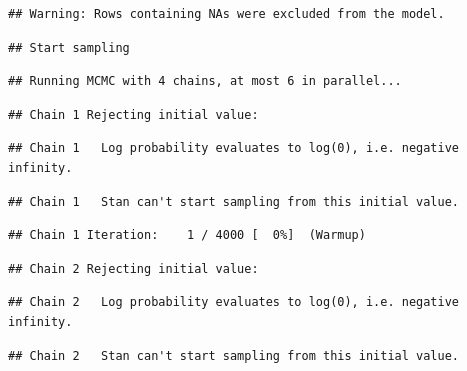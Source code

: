 \documentclass[
]{article}
\begin{document}
\begin{verbatim}
## Warning: Rows containing NAs were excluded from the model.
\end{verbatim}

\begin{verbatim}
## Start sampling
\end{verbatim}

\begin{verbatim}
## Running MCMC with 4 chains, at most 6 in parallel...
\end{verbatim}

\begin{verbatim}
## Chain 1 Rejecting initial value:
\end{verbatim}

\begin{verbatim}
## Chain 1   Log probability evaluates to log(0), i.e. negative infinity.
\end{verbatim}

\begin{verbatim}
## Chain 1   Stan can't start sampling from this initial value.
\end{verbatim}

\begin{verbatim}
## Chain 1 Iteration:    1 / 4000 [  0%]  (Warmup)
\end{verbatim}

\begin{verbatim}
## Chain 2 Rejecting initial value:
\end{verbatim}

\begin{verbatim}
## Chain 2   Log probability evaluates to log(0), i.e. negative infinity.
\end{verbatim}

\begin{verbatim}
## Chain 2   Stan can't start sampling from this initial value.
\end{verbatim}
\end{document}
